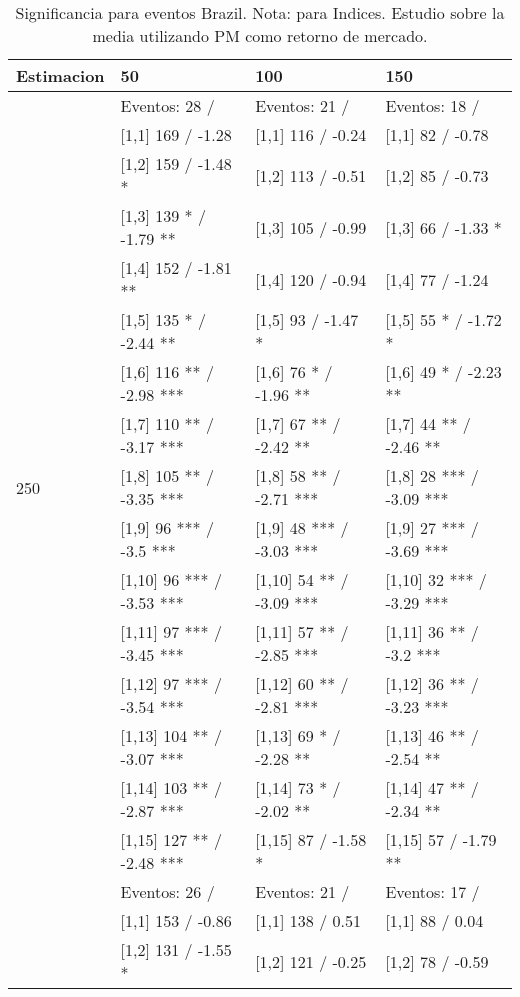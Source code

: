 \begin{table}

\caption{Significancia para eventos Brazil. Nota: para Indices. Estudio sobre la media utilizando PM como retorno de mercado.}
\centering
\begin{tabular}[t]{llll}
\toprule
Estimacion & 50 & 100 & 150\\
\midrule
 & Eventos:  28 / & Eventos:  21 / & Eventos:  18 /\\
 & {}[1,1] 169  / -1.28 & {}[1,1] 116  / -0.24 & {}[1,1] 82  / -0.78\\
 & {}[1,2] 159  / -1.48 * & {}[1,2] 113  / -0.51 & {}[1,2] 85  / -0.73\\
 & {}[1,3] 139 * / -1.79 ** & {}[1,3] 105  / -0.99 & {}[1,3] 66  / -1.33 *\\
 & {}[1,4] 152  / -1.81 ** & {}[1,4] 120  / -0.94 & {}[1,4] 77  / -1.24\\
\addlinespace
 & {}[1,5] 135 * / -2.44 ** & {}[1,5] 93  / -1.47 * & {}[1,5] 55 * / -1.72 *\\
 & {}[1,6] 116 ** / -2.98 *** & {}[1,6] 76 * / -1.96 ** & {}[1,6] 49 * / -2.23 **\\
 & {}[1,7] 110 ** / -3.17 *** & {}[1,7] 67 ** / -2.42 ** & {}[1,7] 44 ** / -2.46 **\\
250 & {}[1,8] 105 ** / -3.35 *** & {}[1,8] 58 ** / -2.71 *** & {}[1,8] 28 *** / -3.09 ***\\
 & {}[1,9] 96 *** / -3.5 *** & {}[1,9] 48 *** / -3.03 *** & {}[1,9] 27 *** / -3.69 ***\\
\addlinespace
 & {}[1,10] 96 *** / -3.53 *** & {}[1,10] 54 ** / -3.09 *** & {}[1,10] 32 *** / -3.29 ***\\
 & {}[1,11] 97 *** / -3.45 *** & {}[1,11] 57 ** / -2.85 *** & {}[1,11] 36 ** / -3.2 ***\\
 & {}[1,12] 97 *** / -3.54 *** & {}[1,12] 60 ** / -2.81 *** & {}[1,12] 36 ** / -3.23 ***\\
 & {}[1,13] 104 ** / -3.07 *** & {}[1,13] 69 * / -2.28 ** & {}[1,13] 46 ** / -2.54 **\\
 & {}[1,14] 103 ** / -2.87 *** & {}[1,14] 73 * / -2.02 ** & {}[1,14] 47 ** / -2.34 **\\
\addlinespace
 & {}[1,15] 127 ** / -2.48 *** & {}[1,15] 87  / -1.58 * & {}[1,15] 57  / -1.79 **\\
 & Eventos:  26 / & Eventos:  21 / & Eventos:  17 /\\
 & {}[1,1] 153  / -0.86 & {}[1,1] 138  / 0.51 & {}[1,1] 88  / 0.04\\
 & {}[1,2] 131  / -1.55 * & {}[1,2] 121  / -0.25 & {}[1,2] 78  / -0.59\\

\end{tabular}
\end{table}
